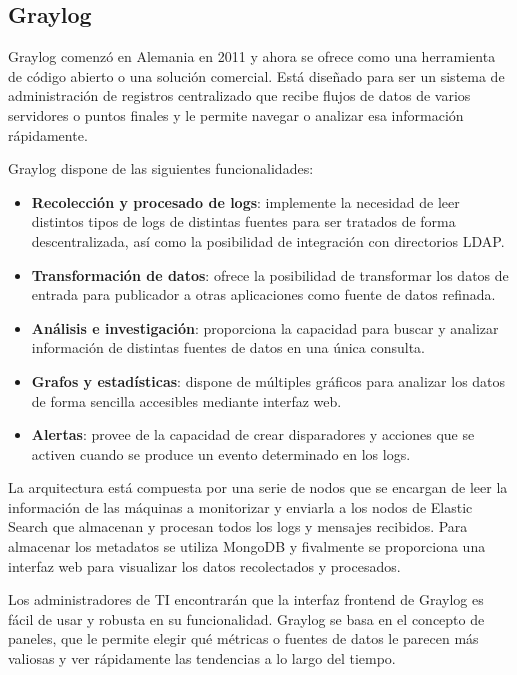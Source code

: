 \subsection{Graylog}

Graylog comenzó en Alemania en 2011 y ahora se ofrece como una herramienta de código abierto o una solución comercial. Está diseñado para ser un sistema de administración de registros centralizado que recibe flujos de datos de varios servidores o puntos finales y le permite navegar o analizar esa información rápidamente.

Graylog dispone de las siguientes funcionalidades:

\begin{itemize}
\item \textbf{Recolección y procesado de logs}: implemente la necesidad de leer distintos tipos de logs de distintas fuentes para ser tratados de forma descentralizada, así como la posibilidad de integración con directorios LDAP.

\item \textbf{Transformación de datos}: ofrece la posibilidad de transformar los datos de entrada para publicador a otras aplicaciones como fuente de datos refinada.

\item \textbf{Análisis e investigación}: proporciona la capacidad para buscar y analizar información  de distintas fuentes de datos en una única consulta.

\item \textbf{Grafos y estadísticas}: dispone de múltiples gráficos para analizar los datos de forma sencilla accesibles mediante interfaz web.

\item \textbf{Alertas}: provee de la capacidad de crear disparadores y acciones que se activen cuando se produce un evento determinado en los logs. 
\end{itemize}

La arquitectura está compuesta por una serie de nodos que se encargan de leer la información de las máquinas a monitorizar y enviarla a los nodos de Elastic Search que almacenan y procesan todos los logs y mensajes recibidos. Para almacenar los metadatos se utiliza MongoDB y fivalmente se proporciona una interfaz web para visualizar los datos recolectados y procesados.

Los administradores de TI encontrarán que la interfaz frontend de Graylog es fácil de usar y robusta en su funcionalidad. Graylog se basa en el concepto de paneles, que le permite elegir qué métricas o fuentes de datos le parecen más valiosas y ver rápidamente las tendencias a lo largo del tiempo.

